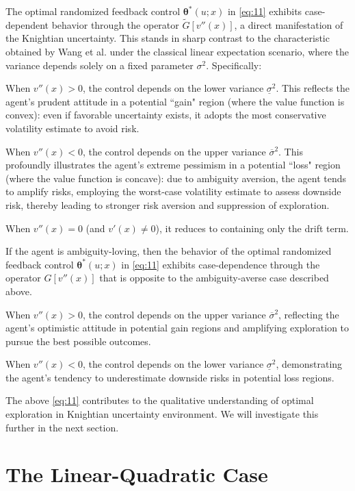 \documentclass[onecolumn, journal]{IEEEtran} %
\begin{document}
	The optimal randomized feedback control $\boldsymbol{\theta}^*(u;x)$ in \eqref{eq:11} exhibits case-dependent behavior through the operator $\widetilde{G}[v''(x)]$, a direct manifestation of the Knightian uncertainty. This stands in sharp contrast to the characteristic obtained by Wang et al. \cite{wang2020reinforcement} under the classical linear expectation scenario, where the variance depends solely on a fixed parameter $\sigma^2$. Specifically:
	
	When $v''(x) > 0$, the control depends on the lower variance $\underline{\sigma}^2$. This reflects the agent's prudent attitude in a potential ``gain" region (where the value function is convex): even if favorable uncertainty exists, it adopts the most conservative volatility estimate to avoid risk.
	
	When $v''(x) < 0$, the control depends on the upper variance $\overline{\sigma}^2$. This profoundly illustrates the agent's extreme pessimism in a potential ``loss" region (where the value function is concave): due to ambiguity aversion, the agent tends to amplify risks, employing the worst-case volatility estimate to assess downside risk, thereby leading to stronger risk aversion and suppression of exploration.
	
	When $v''(x) = 0$ (and $v'(x) \neq 0$), it reduces to containing only the drift term.
	
	If the agent is ambiguity-loving, then the behavior of the optimal randomized feedback control $\boldsymbol{\theta}^*(u;x)$ in \eqref{eq:11} exhibits case-dependence through the operator ${G}[v''(x)]$ that is opposite to the ambiguity-averse case described above.
	
	When $v''(x) > 0$, the control depends on the upper variance $\overline{\sigma}^2$, reflecting the agent's optimistic attitude in potential gain regions and amplifying exploration to pursue the best possible outcomes.
	
	When $v''(x) < 0$, the control depends on the lower variance $\underline{\sigma}^2$, demonstrating the agent's tendency to underestimate downside risks in potential loss regions.
	
	The above \eqref{eq:11} contributes to the qualitative understanding of optimal exploration in Knightian uncertainty environment. We will investigate this further in the next section.
	
	\section{The Linear-Quadratic Case}
	
\end{document}
